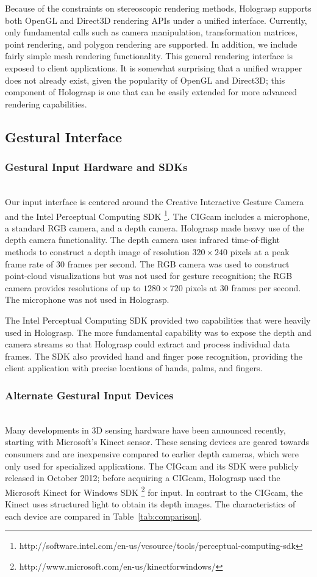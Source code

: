 \documentclass[pageno]{jpaper}
\begin{document}
Because of the constraints on stereoscopic rendering methods, Holograsp supports both OpenGL and Direct3D rendering APIs under a unified interface.
Currently, only fundamental calls such as camera manipulation, transformation matrices, point rendering, and polygon rendering are supported. In addition,
we include fairly simple mesh rendering functionality. This general rendering interface is exposed to client applications. It is somewhat surprising that
a unified wrapper does not already exist, given the popularity of OpenGL and Direct3D; this component of Holograsp is one that can be easily extended for
more advanced rendering capabilities.

\subsection{Gestural Interface}
\subsubsection{Gestural Input Hardware and SDKs} $ $\\
Our input interface is centered around the Creative Interactive Gesture Camera and the Intel Perceptual Computing SDK
\footnote{http://software.intel.com/en-us/vcsource/tools/perceptual-computing-sdk}.
The CIGcam includes a microphone, a standard RGB camera, and a depth camera. Holograsp made heavy use of the depth camera functionality.
The depth camera uses infrared time-of-flight methods to construct a depth image of resolution $320 \times 240$ pixels at a peak frame
rate of 30 frames per second. The RGB camera was used to construct point-cloud visualizations but was not used for gesture recognition;
the RGB camera provides resolutions of up to $1280 \times 720$ pixels at 30 frames per second. The microphone was not used in Holograsp.

The Intel Perceptual Computing SDK provided two capabilities that were heavily used in Holograsp. The more fundamental capability was
to expose the depth and camera streams so that Holograsp could extract and process individual data frames. The SDK also provided
hand and finger pose recognition, providing the client application with precise locations of hands, palms, and fingers.

\subsubsection{Alternate Gestural Input Devices}$ $\\
Many developments in 3D sensing hardware have been announced recently, starting with Microsoft's Kinect sensor. These sensing
devices are geared towards consumers and are inexpensive compared to earlier depth cameras, which were only used for specialized applications.
The CIGcam and its SDK were publicly released in October 2012; before acquiring a CIGcam, Holograsp used the Microsoft Kinect for Windows SDK
\footnote{http://www.microsoft.com/en-us/kinectforwindows/} for input. In contrast to the CIGcam, the Kinect uses structured light
to obtain its depth images. The characteristics of each device are compared in Table~\ref{tab:comparison}.
\end{document}
